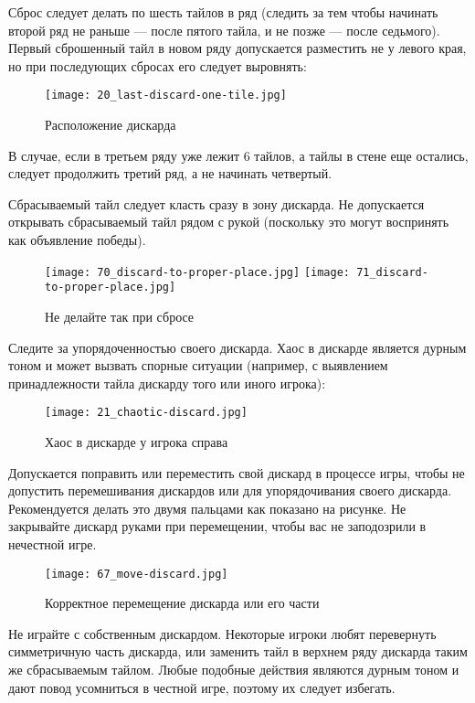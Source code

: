 \newpage

Сброс следует делать по шесть тайлов в ряд (следить за тем чтобы начинать второй ряд не раньше --- после пятого тайла, и не позже --- после седьмого). Первый сброшенный тайл в новом ряду допускается разместить не у левого края, но при последующих сбросах его следует выровнять:

\begin{figure}[H]
	\centering
	\texttt{[image: 20\_last-discard-one-tile.jpg]}
	\caption{Расположение дискарда}
\end{figure}

В случае, если в третьем ряду уже лежит 6 тайлов, а тайлы в стене еще остались, следует продолжить третий ряд, а не начинать четвертый.

Сбрасываемый тайл следует класть сразу в зону дискарда. Не допускается открывать сбрасываемый тайл рядом с рукой (поскольку это могут воспринять как объявление победы).

\begin{figure}[H]
	\centering
	\texttt{[image: 70\_discard-to-proper-place.jpg]}
	\texttt{[image: 71\_discard-to-proper-place.jpg]}
	\caption{Не делайте так при сбросе}
\end{figure}

\newpage

Следите за упорядоченностью своего дискарда. Хаос в дискарде является дурным тоном и может вызвать спорные ситуации (например, с выявлением принадлежности тайла дискарду того или иного игрока):

\begin{figure}[H]
	\centering
	\texttt{[image: 21\_chaotic-discard.jpg]}
	\caption{Хаос в дискарде у игрока справа}
\end{figure}

Допускается поправить или переместить свой дискард в процессе игры, чтобы не допустить перемешивания дискардов или для упорядочивания своего дискарда. Рекомендуется делать это двумя пальцами как показано на рисунке. Не закрывайте дискард руками при перемещении, чтобы вас не заподозрили в нечестной игре.

\begin{figure}[H]
	\centering
	\texttt{[image: 67\_move-discard.jpg]}
	\caption{Корректное перемещение дискарда или его части}
\end{figure}

\newpage

Не играйте с собственным дискардом. Некоторые игроки любят перевернуть симметричную часть дискарда, или заменить тайл в верхнем ряду дискарда таким же сбрасываемым тайлом. Любые подобные действия являются дурным тоном и дают повод усомниться в честной игре, поэтому их следует избегать.

